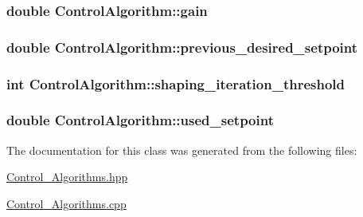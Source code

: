 \subsubsection[{\texorpdfstring{gain}{gain}}]{\setlength{\rightskip}{0pt plus 5cm}double Control\+Algorithm\+::gain\hspace{0.3cm}{\ttfamily [protected]}}\hypertarget{classControlAlgorithm_a2ac40220b20a6bf9f1ee0665138467a5}{}\label{classControlAlgorithm_a2ac40220b20a6bf9f1ee0665138467a5}
\subsubsection[{\texorpdfstring{previous\+\_\+desired\+\_\+setpoint}{previous_desired_setpoint}}]{\setlength{\rightskip}{0pt plus 5cm}double Control\+Algorithm\+::previous\+\_\+desired\+\_\+setpoint\hspace{0.3cm}{\ttfamily [protected]}}\hypertarget{classControlAlgorithm_adc4574602d459aca5b9320937bc102b1}{}\label{classControlAlgorithm_adc4574602d459aca5b9320937bc102b1}
\subsubsection[{\texorpdfstring{shaping\+\_\+iteration\+\_\+threshold}{shaping_iteration_threshold}}]{\setlength{\rightskip}{0pt plus 5cm}int Control\+Algorithm\+::shaping\+\_\+iteration\+\_\+threshold\hspace{0.3cm}{\ttfamily [protected]}}\hypertarget{classControlAlgorithm_ac1a0dc23fe7d2cac2301de1d7e95c357}{}\label{classControlAlgorithm_ac1a0dc23fe7d2cac2301de1d7e95c357}
\subsubsection[{\texorpdfstring{used\+\_\+setpoint}{used_setpoint}}]{\setlength{\rightskip}{0pt plus 5cm}double Control\+Algorithm\+::used\+\_\+setpoint\hspace{0.3cm}{\ttfamily [protected]}}\hypertarget{classControlAlgorithm_a02ba55f15705474b47a0635b027a7b44}{}\label{classControlAlgorithm_a02ba55f15705474b47a0635b027a7b44}


The documentation for this class was generated from the following files\+:\begin{DoxyCompactItemize}
\item 
\hyperlink{Control__Algorithms_8hpp}{Control\+\_\+\+Algorithms.\+hpp}\item 
\hyperlink{Control__Algorithms_8cpp}{Control\+\_\+\+Algorithms.\+cpp}\end{DoxyCompactItemize}
